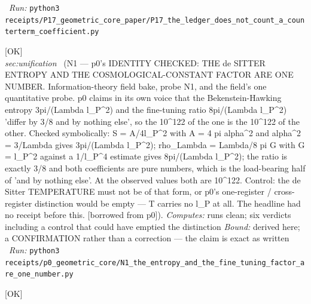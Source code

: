 \begin{description}
\ \emph{Run:} \texttt{python3 receipts/P17\_geometric\_core\_paper/P17\_the\_ledger\_does\_not\_count\_a\_counterterm\_coefficient.py}
\item[\label{rcpt:N1_the_entropy_and_the_fine_tuning_factor_are_one_number}\textbf{}\quad\texttt{N1\_the\_entropy\_and\_the\_fine\_tuning\_factor\_are\_one\_number}]\hfill\textsf{[OK]}\\
\textit{sec:unification} \ (N1 --- p0's IDENTITY CHECKED: THE de SITTER ENTROPY AND THE COSMOLOGICAL-CONSTANT FACTOR ARE ONE NUMBER. Information-theory field bake, probe N1, and the field's one quantitative probe. p0 claims in its own voice that the Bekenstein-Hawking entropy 3pi/(Lambda l\_P\textasciicircum{}2) and the fine-tuning ratio 8pi/(Lambda l\_P\textasciicircum{}2) 'differ by 3/8 and by nothing else', so the 10\textasciicircum{}122 of the one is the 10\textasciicircum{}122 of the other. Checked symbolically: S = A/4l\_P\textasciicircum{}2 with A = 4 pi alpha\textasciicircum{}2 and alpha\textasciicircum{}2 = 3/Lambda gives 3pi/(Lambda l\_P\textasciicircum{}2); rho\_Lambda = Lambda/8 pi G with G = l\_P\textasciicircum{}2 against a 1/l\_P\textasciicircum{}4 estimate gives 8pi/(Lambda l\_P\textasciicircum{}2); the ratio is exactly 3/8 and both coefficients are pure numbers, which is the load-bearing half of 'and by nothing else'. At the observed values both are 10\textasciicircum{}122. Control: the de Sitter TEMPERATURE must not be of that form, or p0's one-register / cross-register distinction would be empty --- T carries no l\_P at all. The headline had no receipt before this. [borrowed from p0]). 
\emph{Computes:} runs clean; six verdicts including a control that could have emptied the distinction
 \emph{Bound:} derived here; a CONFIRMATION rather than a correction --- the claim is exact as written
\ \emph{Run:} \texttt{python3 receipts/p0\_geometric\_core/N1\_the\_entropy\_and\_the\_fine\_tuning\_factor\_are\_one\_number.py}
\item[\rcptlabel{P03_operator_at_general_D}{P3R38}\textbf{P3R38}\quad\texttt{P03\_operator\_at\_general\_D}]\hfill\textsf{[OK]}\\

\end{description}
